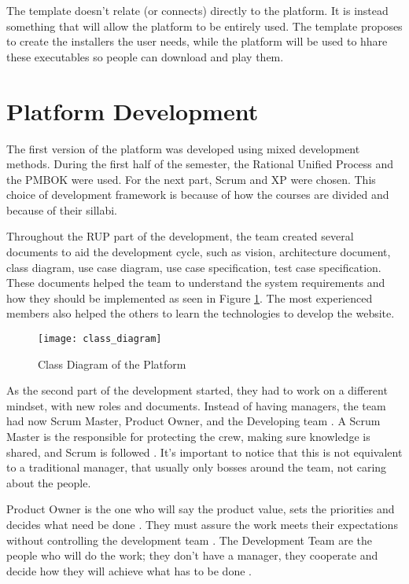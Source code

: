 
The template doesn't relate (or connects) directly to the platform. It is instead something that will allow the platform to be entirely used. The template proposes to create the installers the user needs, while the platform will be used to hhare these executables so people can download and play them.

\section{Platform Development}
\label{sec:platform_development}

The first version of the platform was developed using mixed development methods. During the first half of the semester, the Rational Unified Process and the PMBOK were used. For the next part, Scrum and XP were chosen. This choice of development framework is because of how the courses are divided and because of their sillabi.

Throughout the RUP part of the development, the team created several documents to aid the development cycle, such as vision, architecture document, class diagram, use case diagram, use case specification, test case specification. These documents helped the team to understand the system requirements and how they should be implemented as seen in Figure \ref{fig:class_diagram}. The most experienced members also helped the others to learn the technologies to develop the website.


\begin{figure}[h!]
\centering
\texttt{[image: class\_diagram]}
\caption{Class Diagram of the Platform \cite{plataforma2017arquitetura}}
\label{fig:class_diagram}
\end{figure}

As the second part of the development started, they had to work on a different mindset, with new roles and documents. Instead of having managers, the team had now Scrum Master, Product Owner, and the Developing team \cite{cohen2003agile}. A Scrum Master is the responsible for protecting the crew, making sure knowledge is shared, and Scrum is followed \cite{scrumalliance2017}. It's important to notice that this is not equivalent to a traditional manager, that usually only bosses around the team, not caring about the people.

Product Owner is the one who will say the product value, sets the priorities and decides what need be done \cite{agile422017}. They must assure the work meets their expectations without controlling the development team \cite{schwaber2002agile}. The Development Team are the people who will do the work; they don't have a manager, they cooperate and decide how they will achieve what has to be done \cite{greer2011agile}.


